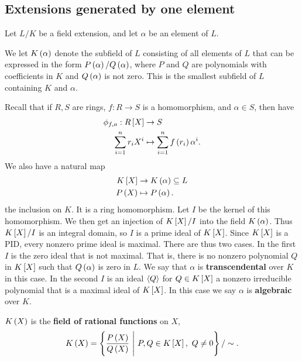 \subsection{Extensions generated by one element}

Let $ L / K $ be a field extension, and let $ \alpha $ be an element of $ L $.

\begin{definition}
We let $ K\rb{\alpha} $ denote the subfield of $ L $ consisting of all elements of $ L $ that can be expressed in the form $ P\rb{\alpha} / Q\rb{\alpha} $, where $ P $ and $ Q $ are polynomials with coefficients in $ K $ and $ Q\rb{\alpha} $ is not zero. This is the smallest subfield of $ L $ containing $ K $ and $ \alpha $.
\end{definition}

Recall that if $ R, S $ are rings, $ f : R \to S $ is a homomorphism, and $ \alpha \in S $, then have
\begin{align*}
\phi_{f, a} : R\sb{X} & \to S \\
\sum_{i = 1}^n r_iX^i & \mapsto \sum_{i = 1}^n f\rb{r_i}\alpha^i.
\end{align*}
We also have a natural map
\begin{align*}
K\sb{X} & \to K\rb{\alpha} \subseteq L \\
P\rb{X} & \mapsto P\rb{\alpha}.
\end{align*}
the inclusion on $ K $. It is a ring homomorphism. Let $ I $ be the kernel of this homomorphism. We then get an injection of $ K\sb{X} / I $ into the field $ K\rb{\alpha} $. Thus $ K\sb{X} / I $ is an integral domain, so $ I $ is a prime ideal of $ K\sb{X} $. Since $ K\sb{X} $ is a PID, every nonzero prime ideal is maximal. There are thus two cases. In the first $ I $ is the zero ideal that is not maximal. That is, there is no nonzero polynomial $ Q $ in $ K\sb{X} $ such that $ Q\rb{\alpha} $ is zero in $ L $. We say that $ \alpha $ is \textbf{transcendental} over $ K $ in this case. In the second $ I $ is an ideal $ \ab{Q} $ for $ Q \in K\sb{X} $ a nonzero irreducible polynomial that is a maximal ideal of $ K\sb{X} $. In this case we say $ \alpha $ is \textbf{algebraic} over $ K $.

\begin{definition}
$ K\rb{X} $ is the \textbf{field of rational functions} on $ X $,
$$ K\rb{X} = \cb{\dfrac{P\rb{X}}{Q\rb{X}} \ \Bigg| \ P, Q \in K\sb{X}, \ Q \ne 0} / \sim. $$
\end{definition}

